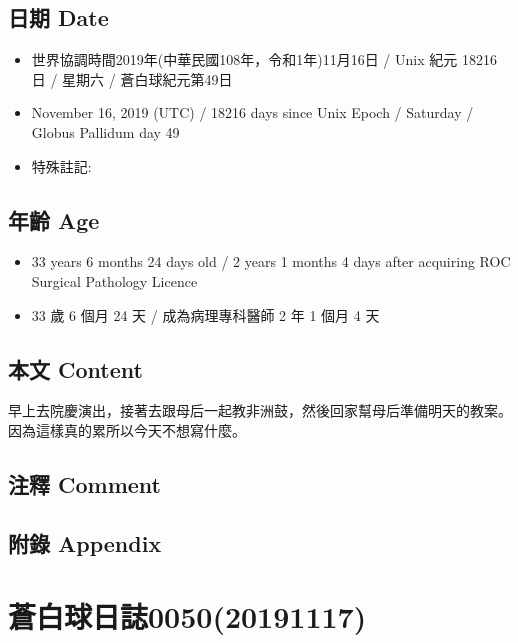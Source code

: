 \documentclass[a5paper, 12pt
]{book}
\providecommand{\tightlist}{%
  \setlength{\itemsep}{0pt}\setlength{\parskip}{0pt}}
\begin{document}
\hypertarget{ux65e5ux671f-date-48}{%
\subsection{日期 Date}\label{ux65e5ux671f-date-48}}

\begin{itemize}
\tightlist
\item
  世界協調時間2019年(中華民國108年，令和1年)11月16日 / Unix 紀元 18216
  日 / 星期六 / 蒼白球紀元第49日
\item
  November 16, 2019 (UTC) / 18216 days since Unix Epoch / Saturday /
  Globus Pallidum day 49
\item
  特殊註記:
\end{itemize}

\hypertarget{ux5e74ux9f61-age-48}{%
\subsection{年齡 Age}\label{ux5e74ux9f61-age-48}}

\begin{itemize}
\tightlist
\item
  33 years 6 months 24 days old / 2 years 1 months 4 days after
  acquiring ROC Surgical Pathology Licence
\item
  33 歲 6 個月 24 天 / 成為病理專科醫師 2 年 1 個月 4 天
\end{itemize}

\hypertarget{ux672cux6587-content-48}{%
\subsection{本文 Content}\label{ux672cux6587-content-48}}

早上去院慶演出，接著去跟母后一起教非洲鼓，然後回家幫母后準備明天的教案。因為這樣真的累所以今天不想寫什麼。

\hypertarget{ux6ce8ux91cb-comment-42}{%
\subsection{注釋 Comment}\label{ux6ce8ux91cb-comment-42}}

\hypertarget{ux9644ux9304-appendix-41}{%
\subsection{附錄 Appendix}\label{ux9644ux9304-appendix-41}}

\hypertarget{ux84bcux767dux7403ux65e5ux8a8c005020191117}{%
\section{蒼白球日誌0050(20191117)}\label{ux84bcux767dux7403ux65e5ux8a8c005020191117}}
\end{document}
